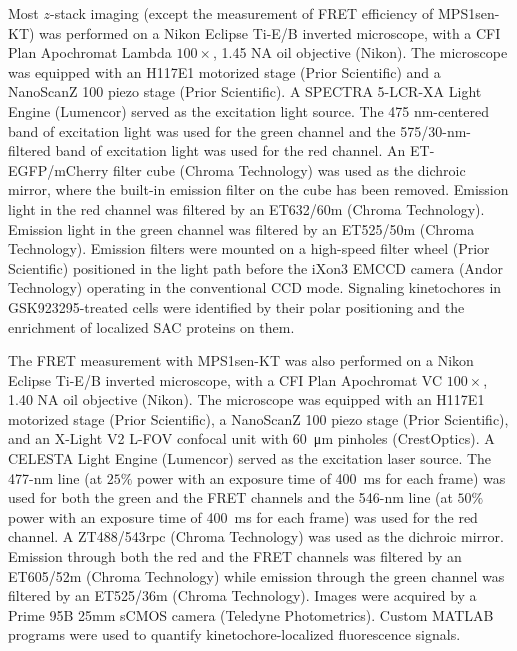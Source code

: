 Most $z$-stack imaging (except the measurement of FRET efficiency of MPS1sen-KT) was performed on a Nikon Eclipse Ti-E/B inverted microscope, with a CFI Plan Apochromat Lambda $100\times$, 1.45 NA oil objective (Nikon). The microscope was equipped with an H117E1 motorized stage (Prior Scientific) and a NanoScanZ 100 piezo stage (Prior Scientific). A SPECTRA 5-LCR-XA Light Engine (Lumencor) served as the excitation light source. The 475 nm-centered band of excitation light was used for the green channel and the 575/30-nm-filtered band of excitation light was used for the red channel. An ET-EGFP/mCherry filter cube (Chroma Technology) was used as the dichroic mirror, where the built-in emission filter on the cube has been removed. Emission light in the red channel was filtered by an ET632/60m (Chroma Technology). Emission light in the green channel was filtered by an ET525/50m (Chroma Technology). Emission filters were mounted on a high-speed filter wheel (Prior Scientific) positioned in the light path before the iXon3 EMCCD camera (Andor Technology) operating in the conventional CCD mode. Signaling kinetochores in GSK923295-treated cells were identified by their polar positioning and the enrichment of localized SAC proteins on them.

The FRET measurement with MPS1sen-KT was also performed on a Nikon Eclipse Ti-E/B inverted microscope, with a CFI Plan Apochromat VC $100\times$, 1.40 NA oil objective (Nikon). The microscope was equipped with an H117E1 motorized stage (Prior Scientific), a NanoScanZ 100 piezo stage (Prior Scientific), and an X-Light V2 L-FOV confocal unit with \SI{60}{\micro m} pinholes (CrestOptics). A CELESTA Light Engine (Lumencor) served as the excitation laser source. The 477-nm line (at $25\%$ power with an exposure time of \SI{400}{ms} for each frame) was used for both the green and the FRET channels and the 546-nm line (at $50\%$ power with an exposure time of \SI{400}{ms} for each frame) was used for the red channel. A ZT488/543rpc (Chroma Technology) was used as the dichroic mirror. Emission through both the red and the FRET channels was filtered by an ET605/52m (Chroma Technology) while emission through the green channel was filtered by an ET525/36m (Chroma Technology). Images were acquired by a Prime 95B 25mm sCMOS camera (Teledyne Photometrics). Custom MATLAB programs \cite{HeLaFRETGUI} were used to quantify kinetochore-localized fluorescence signals.

